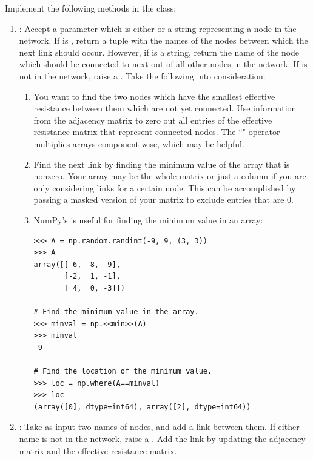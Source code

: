 \begin{problem}
Implement the following methods in the  class:

\begin{enumerate}
\item {}: Accept a parameter  which is either  or a string representing a node in the network. If  is , return a tuple with the names of the nodes between which the next link should occur. However, if  is a string, return the name of the node which should be connected to  next out of all other nodes in the network. If  is not in the network, raise a . Take the following into consideration:

\begin{enumerate}
\item You want to find the two nodes which have the smallest effective resistance between them which are not yet connected.
Use information from the adjacency matrix to zero out all entries of the effective resistance matrix that represent connected nodes. The ``\li{*}" operator multiplies arrays component-wise, which may be helpful.

\item Find the next link by finding the minimum value of the array that is nonzero.
Your array may be the whole matrix or just a column if you are only considering links for a certain node.
This can be accomplished by passing  a masked version of your matrix to exclude entries that are $0$.

\item NumPy's  is useful for finding the minimum value in an array:

\begin{lstlisting}
>>> A = np.random.randint(-9, 9, (3, 3))
>>> A
array([[ 6, -8, -9],
       [-2,  1, -1],
       [ 4,  0, -3]])

# Find the minimum value in the array.
>>> minval = np.<<min>>(A)
>>> minval
-9

# Find the location of the minimum value.
>>> loc = np.where(A==minval)
>>> loc
(array([0], dtype=int64), array([2], dtype=int64))
\end{lstlisting}
\end{enumerate}


\item {}: Take as input two names of nodes, and add a link between them. If either name is not in the network, raise a . Add the link by updating the adjacency matrix and the effective resistance matrix.
\end{enumerate}


\end{problem}

